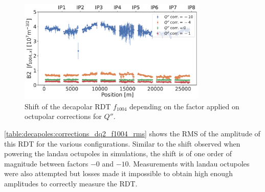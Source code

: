 \begin{figure}[!htb]
    \centering
    \includegraphics[width=0.8\textwidth]{./images/f1004/f1004x_mco_corr.pdf}
    \caption{Shift of the decapolar RDT $f_{1004}$ depending on the factor applied on octupolar
    corrections for $Q''$.}
    \label{decapoles:rdts:measured_f1004_mco}
\end{figure}

  
\cref{table:decapoles:corrections_dq2_f1004_rms} shows the RMS of the amplitude of this RDT for the 
various configurations. Similar to the shift observed when powering the landau octupoles in
simulations, the shift is of one order of magnitude between factors $-0$ and $-10$. Measurements
with landau octupoles were also attempted but losses made it impossible to obtain high enough
amplitudes to correctly measure the RDT.




